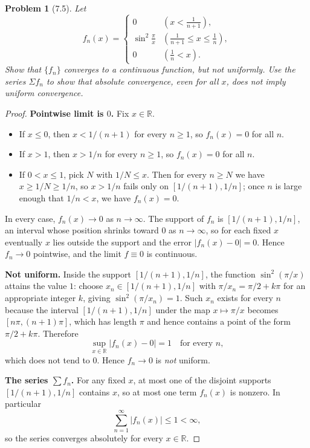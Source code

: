 \documentclass[12 pt]{article}
\newtheorem{prob}{Problem}
\begin{document}
\begin{prob}[7.5]
Let
$$
f_{n}(x)= \begin{cases}0 & \left(x<\frac{1}{n+1}\right), \\ \sin^{2} \frac{\pi}{x} & \left(\frac{1}{n+1} \leq x \leq \frac{1}{n}\right), \\ 0 & \left(\frac{1}{n}<x\right).\end{cases}
$$
Show that $\{f_{n}\}$ converges to a continuous function, but not uniformly. Use the series $\Sigma f_{n}$ to show that absolute convergence, even for all $x$, does not imply uniform convergence.
\end{prob}
\begin{proof}
\textbf{Pointwise limit is $0$.} Fix $x \in \mathbb{R}$.
\begin{itemize}
  \item If $x \leq 0$, then $x < 1/(n+1)$ for every $n \geq 1$, so $f_n(x) = 0$ for all $n$.
  \item If $x > 1$, then $x > 1/n$ for every $n \geq 1$, so $f_n(x) = 0$ for all $n$.
  \item If $0 < x \leq 1$, pick $N$ with $1/N \leq x$. Then for every $n \geq N$ we have $x \geq 1/N \geq 1/n$, so $x > 1/n$ fails only on $[1/(n+1), 1/n]$; once $n$ is large enough that $1/n < x$, we have $f_n(x) = 0$.
\end{itemize}
In every case, $f_n(x) \to 0$ as $n \to \infty$. The support of $f_n$ is $[1/(n+1), 1/n]$, an interval whose position shrinks toward $0$ as $n \to \infty$, so for each fixed $x$ eventually $x$ lies outside the support and the error $|f_n(x) - 0| = 0$. Hence $f_n \to 0$ pointwise, and the limit $f \equiv 0$ is continuous.

\textbf{Not uniform.} Inside the support $[1/(n+1), 1/n]$, the function $\sin^2(\pi/x)$ attains the value $1$: choose $x_n \in [1/(n+1), 1/n]$ with $\pi/x_n = \pi/2 + k\pi$ for an appropriate integer $k$, giving $\sin^2(\pi/x_n) = 1$. Such $x_n$ exists for every $n$ because the interval $[1/(n+1), 1/n]$ under the map $x \mapsto \pi/x$ becomes $[n\pi, (n+1)\pi]$, which has length $\pi$ and hence contains a point of the form $\pi/2 + k\pi$. Therefore
$$
\sup_{x \in \mathbb{R}} |f_n(x) - 0| = 1 \quad \text{for every } n,
$$
which does not tend to $0$. Hence $f_n \to 0$ is \emph{not} uniform.

\textbf{The series $\sum f_n$.} For any fixed $x$, at most one of the disjoint supports $[1/(n+1), 1/n]$ contains $x$, so at most one term $f_n(x)$ is nonzero. In particular
$$
\sum_{n=1}^{\infty} |f_n(x)| \leq 1 < \infty,
$$
so the series converges absolutely for every $x \in \mathbb{R}$.


\end{proof}
\end{document}
